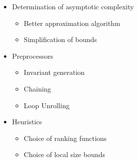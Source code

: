 \begin{itemize}
\item Determination of asymptotic complexity
  \begin{itemize}
    \item Better approximation algorithm
    \item Simplification of bounds
  \end{itemize}
\item Preprocessors
  \begin{itemize}
  \item Invariant generation
  \item Chaining
  \item Loop Unrolling
  \end{itemize}
\item Heuristics
  \begin{itemize}
  \item Choice of ranking functions
  \item Choice of local size bounds
  \end{itemize}
\end{itemize}
